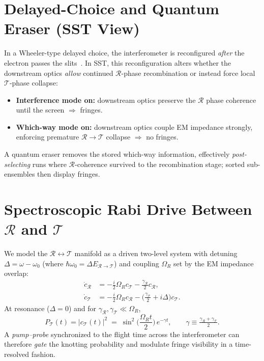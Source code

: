 \documentclass[11pt,a4paper]{article}
\begin{document}
\section{Delayed-Choice and Quantum Eraser (SST View)}

In a Wheeler-type delayed choice, the interferometer is reconfigured \emph{after} the electron passes the slits~\cite{Wheeler1978}.
In SST, this reconfiguration alters whether the downstream optics \emph{allow} continued $\mathcal R$-phase recombination or instead force local $\mathcal T$-phase collapse:
\begin{itemize}
\item \textbf{Interference mode on:} downstream optics preserve the $\mathcal R$ phase coherence until the screen $\Rightarrow$ fringes.
\item \textbf{Which-way mode on:} downstream optics couple EM impedance strongly, enforcing premature $\mathcal R\!\to\!\mathcal T$ collapse $\Rightarrow$ no fringes.
\end{itemize}
A quantum eraser removes the stored which-way information, effectively \emph{post-selecting} runs where $\mathcal R$-coherence survived to the recombination stage; sorted sub-ensembles then display fringes.

\section{Spectroscopic Rabi Drive Between $\mathcal R$ and $\mathcal T$}

We model the $\mathcal R\leftrightarrow\mathcal T$ manifold as a driven two-level system with detuning $\Delta=\omega-\omega_0$ (where $\hbar\omega_0=\Delta E_{\mathcal R\to\mathcal T}$) and coupling $\Omega_R$ set by the EM impedance overlap:
\begin{align}
\dot c_{\mathcal R} &= -\tfrac{i}{2}\Omega_R c_{\mathcal T} - \tfrac{\gamma_{\mathcal R}}{2} c_{\mathcal R},\\
\dot c_{\mathcal T} &= -\tfrac{i}{2}\Omega_R c_{\mathcal R} - \Big(\tfrac{\gamma_{\mathcal T}}{2} + i\Delta\Big) c_{\mathcal T}.
\end{align}
At resonance ($\Delta=0$) and for $\gamma_{\mathcal R},\gamma_{\mathcal T}\ll \Omega_R$,
\begin{equation}
P_{\mathcal T}(t)=|c_{\mathcal T}(t)|^2 \;=\; \sin^2\!\Big(\frac{\Omega_R t}{2}\Big)\,e^{-\gamma t},\qquad \gamma\equiv\tfrac{\gamma_{\mathcal R}+\gamma_{\mathcal T}}{2}.
\end{equation}
A \emph{pump--probe} synchronized to the flight time across the interferometer can therefore \emph{gate} the knotting probability and modulate fringe visibility in a time-resolved fashion.
\end{document}
